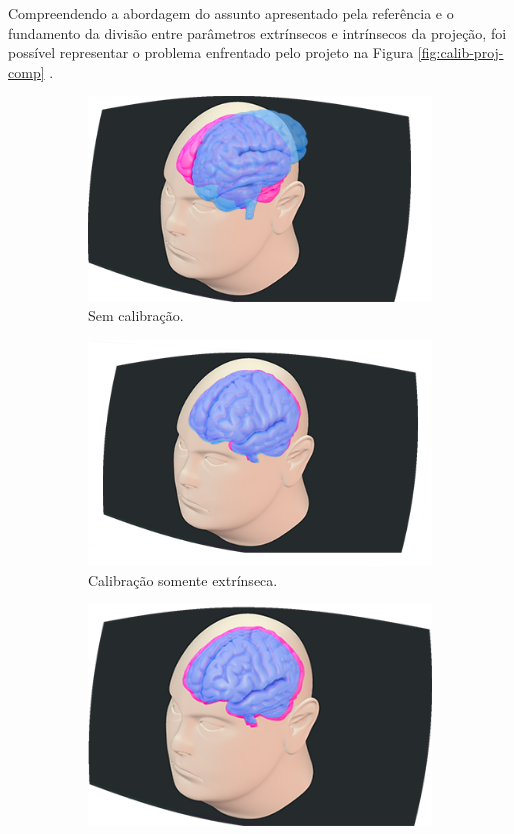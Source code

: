 Compreendendo a abordagem do assunto apresentado pela referência e o fundamento da divisão entre parâmetros extrínsecos e intrínsecos da projeção, foi possível representar o problema enfrentado pelo projeto na Figura \ref{fig:calib-proj-comp} \cite{augmented-calib}.

\begin{figure}[H]
    \centering
    \begin{subfigure}{.4\textwidth}
        \centering
        \includegraphics[width=.65\textwidth]{figuras/CalibNot2.png}
        \caption{Sem calibração.}
        \label{fig:calib-proj-without}
    \end{subfigure}
    \begin{subfigure}{.4\textwidth}
        \centering
        \includegraphics[width=.65\textwidth]{figuras/CalibExtr.png}
        \caption{Calibração somente extrínseca.}
        \label{fig:calib-proj-extr}
    \end{subfigure}
    \begin{subfigure}{.4\textwidth}
        \centering
        \includegraphics[width=.65\textwidth]{figuras/CalibIntr.png}

\end{subfigure}
\end{figure}
